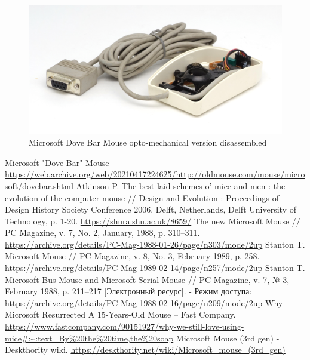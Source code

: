 \documentclass[11pt, a4paper]{article}
\begin{document}
\begin{figure}[h]
    \centering
    \includegraphics[scale=0.5]{1987_microsoft_dove_bar_mouse/inside2_60.jpg}
    \caption{Microsoft Dove Bar Mouse opto-mechanical version disassembled}
    \label{fig:MicrosoftDoveBarInside}
\end{figure}

\begin{thebibliography}{9}
 Microsoft "Dove Bar" Mouse \url{https://web.archive.org/web/20210417224625/http://oldmouse.com/mouse/microsoft/dovebar.shtml}
 Atkinson P. The best laid schemes o’ mice and men : the evolution of the computer mouse // Design and Evolution : Proceedings of Design History Society Conference 2006. Delft, Netherlands, Delft University of Technology, p. 1-20. \url{https://shura.shu.ac.uk/8659/}
 The new Microsoft Mouse // PC Magazine, v. 7, No. 2, January, 1988, p. 310--311. \url{https://archive.org/details/PC-Mag-1988-01-26/page/n303/mode/2up}
 Stanton T. Microsoft Mouse // PC Magazine, v. 8, No. 3, February 1989, p. 258. \url{https://archive.org/details/PC-Mag-1989-02-14/page/n257/mode/2up}
 Stanton T. Microsoft Bus Mouse and Microsoft Serial Mouse // PC Magazine, v. 7, № 3, February 1988, p. 211--217 [Электронный ресурс]. - Режим доступа: \url{https://archive.org/details/PC-Mag-1988-02-16/page/n209/mode/2up}
 Why Microsoft Resurrected A 15-Years-Old Mouse -- Fast Company. \url{https://www.fastcompany.com/90151927/why-we-still-love-using-mice#:~:text=By%20the%20time,the%20soap}
 Microsoft Mouse (3rd gen) - Deskthority wiki. \url{https://deskthority.net/wiki/Microsoft_mouse_(3rd_gen)}
\end{thebibliography}
\end{document}
